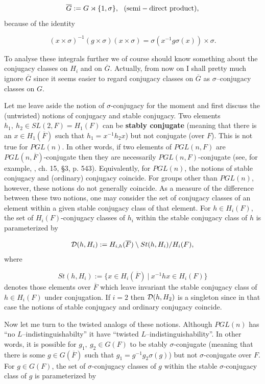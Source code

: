 \documentclass[12pt,letterpaper]{article}
\def\ddd{{\cal D}}
\def\ovF{\overline{F}}
\begin{document}
\[
\overline{G} := G \rtimes \{1,\sigma \},\ \ {\rm (semi-direct\ product)},
\]
because of the identity

\[
(x\times \sigma )^{-1}(g\times \sigma )(x\times \sigma )
=\sigma (x^{-1}g\sigma (x))\times \sigma .
\]
 
To analyse these integrals further we of course should know something
about the conjugacy classes on $H_i$ and on $\overline{G}$. Actually,
from now on I shall pretty much ignore $\overline{G}$ since it
seems easier to regard conjugacy classes on
$\overline{G}$ as $\sigma$--conjugacy classes on $G$. 
 
Let me leave aside the notion of $\sigma$-conjugacy for the moment
and first discuss the (untwisted) notions of conjugacy and
stable conjugacy. Two elements
$h_1,\ h_2 \in SL(2,F) = H_1(F)$ can be {\bf stably conjugate}
(meaning that there is an $x \in H_1(\ovF )$ such that
$h_1 = x^{-1}h_2x$) but not conjugate (over $F$). 
This is not true for $PGL(n)$. 
In other words, if two elements of $PGL(n,F)$ are
$PGL(n,\ovF )$-conjugate then they are necessarily
$PGL(n,F)$-conjugate (see, for example, \cite{L}, ch. 15, \S 3, p. 543).
Equivalently, for $PGL(n)$, the notions of stable 
conjugacy and (ordinary) conjugacy coincide. 
For groups other than
$PGL(n)$, however, these notions do not generally coincide. 
As a measure of the 
difference between these two notions, one may consider the set
of conjugacy classes of an element within a given stable conjugacy class
of that element. 
For $h \in H_i(F)$, the set of $H_i(F)$-conjugacy
classes of $h_i$ within the stable conjugacy class of $h$ is parameterized 
by 

\begin{equation}
\label{eqn:1.19}
\ddd (h,H_i) := H_{i,h}(\ovF )\setminus St(h,H_i)/H_i(F),
\end{equation}
where

\[
St(h,H_i) := \{x \in H_i(\ovF )\ |\ x^{-1}hx \in H_i(F)\}
\]
denotes those elements over $\ovF$ which leave invariant the
stable conjugacy class of $h \in H_i(F)$ under conjugation. 
If $i = 2$ then
$\ddd (h,H_2)$ is a singleton since in that case the notions of 
stable conjugacy and ordinary conjugacy coincide. 
 
Now let me turn to the twisted analogs of these notions. Although
$PGL(n)$ has ``no $L$--indistinguishabilty'' it  have
``twisted 
\newline
$L$--indistinguishability''. In other words, it is
possible for $g_1,\ g_2 \in G(F)$ to be stably $\sigma$-conjugate
(meaning that there is some $g\in G(\ovF )$ such that
$g_1 = g^{-1}g_2\sigma (g)$) but not $\sigma$-conjugate over $F$.
For $g \in G(F)$, the set of $\sigma$-conjugacy classes of $g$ within the
stable $\sigma$-conjugacy class of $g$ is parameterized by
\end{document}
